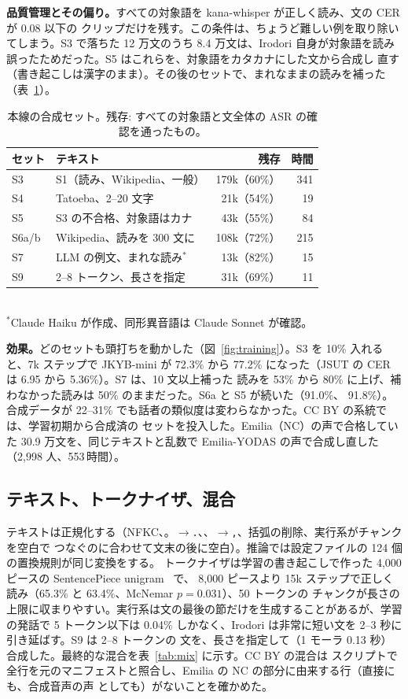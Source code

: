 \documentclass[10pt,a4paper,twocolumn]{article}
\begin{document}
\textbf{品質管理とその偏り。}すべての対象語を kana-whisper が正しく読み、文の CER が 0.08 以下の
クリップだけを残す。この条件は、ちょうど難しい例を取り除いてしまう。S3 で落ちた 12 万文のうち 8.4
万文は、Irodori 自身が対象語を読み誤ったためだった。S5 はこれらを、対象語をカタカナにした文から合成し
直す（書き起こしは漢字のまま）。その後のセットで、まれなままの読みを補った（表~\ref{tab:synth}）。

\begin{table}[t]
\centering\footnotesize\setlength{\tabcolsep}{3pt}
\caption{本線の合成セット。残存: すべての対象語と文全体の ASR の確認を通ったもの。}
\label{tab:synth}\setlength{\tabcolsep}{2.2pt}
\begin{tabular}{@{}llrr@{}}
\toprule
セット & テキスト & 残存 & 時間\\
\midrule
S3 & S1（読み、Wikipedia、一般） & 179k（60\%） & 341\\
S4 & Tatoeba、2--20 文字 & 21k（54\%） & 19\\
S5 & S3 の不合格、対象語はカナ & 43k（55\%） & 84\\
S6a/b & Wikipedia、読みを 300 文に & 108k（72\%） & 215\\
S7 & LLM の例文、まれな読み$^\ast$ & 13k（82\%） & 15\\
S9 & 2--8 トークン、長さを指定 & 31k（69\%） & 11\\
\bottomrule
\end{tabular}\\[2pt]
{\footnotesize $^\ast$Claude Haiku が作成、同形異音語は Claude Sonnet が確認。}
\end{table}

\textbf{効果。}どのセットも頭打ちを動かした（図~\ref{fig:training}）。S3 を 10\% 入れると、7k ステップで
JKYB-mini が 72.3\% から 77.2\% になった（JSUT の CER は 6.95 から 5.36\%）。S7 は、10 文以上補った
読みを 53\% から 80\% に上げ、補わなかった読みは 50\% のままだった。S6a と S5 が続いた（91.0\%、
91.8\%）。合成データが 22--31\% でも話者の類似度は変わらなかった。CC BY の系統では、学習初期から合成済の
セットを投入した。Emilia（NC）の声で合格していた 30.9 万文を、同じテキストと乱数で Emilia-YODAS の声で合成し直した（2,998 人、553\,時間）。

\subsection{テキスト、トークナイザ、混合}
テキストは正規化する（NFKC、。$\to$\texttt{.}、、$\to$\texttt{,}、括弧の削除、実行系がチャンクを空白で
つなぐのに合わせて文末の後に空白）。推論では設定ファイルの 124 個の置換規則が同じ変換をする。
トークナイザは学習の書き起こしで作った 4,000 ピースの SentencePiece unigram~\cite{sentencepiece} で、
8,000 ピースより 15k ステップで正しく読み（65.3\% と 63.4\%、McNemar $p=0.031$）、50 トークンの
チャンクが長さの上限に収まりやすい。実行系は文の最後の節だけを生成することがあるが、学習の発話で
5 トークン以下は 0.04\% しかなく、Irodori は非常に短い文を 2--3 秒に引き延ばす。S9 は 2--8 トークンの
文を、長さを指定して（1 モーラ 0.13 秒）合成した。最終的な混合を表~\ref{tab:mix} に示す。CC BY の混合は
スクリプトで全行を元のマニフェストと照合し、Emilia の NC の部分に由来する行（直接にも、合成音声の声
としても）がないことを確かめた。
\end{document}
